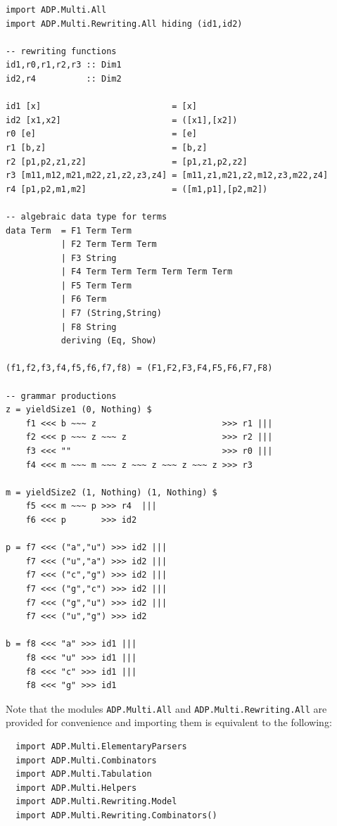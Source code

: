 \documentclass[
    a4paper,
    12pt,
    twoside,
    BCOR=12mm,
    parskip=half,
    chapterprefix,
    numbers=noenddot,
    bibliography=totoc
]{scrbook}
\begin{document}
\begin{lstlisting}[name=lst_yield,caption=Implementation of $\mathcal{G}_{C2u-T}$ as yield parser with adp-multi]
import ADP.Multi.All
import ADP.Multi.Rewriting.All hiding (id1,id2)

-- rewriting functions
id1,r0,r1,r2,r3 :: Dim1
id2,r4          :: Dim2

id1 [x]                          = [x]
id2 [x1,x2]                      = ([x1],[x2])
r0 [e]                           = [e]
r1 [b,z]                         = [b,z]
r2 [p1,p2,z1,z2]                 = [p1,z1,p2,z2]
r3 [m11,m12,m21,m22,z1,z2,z3,z4] = [m11,z1,m21,z2,m12,z3,m22,z4]
r4 [p1,p2,m1,m2]                 = ([m1,p1],[p2,m2])

-- algebraic data type for terms
data Term  = F1 Term Term
           | F2 Term Term Term
           | F3 String
           | F4 Term Term Term Term Term Term
           | F5 Term Term
           | F6 Term
           | F7 (String,String)
           | F8 String
           deriving (Eq, Show)

(f1,f2,f3,f4,f5,f6,f7,f8) = (F1,F2,F3,F4,F5,F6,F7,F8)

-- grammar productions
z = yieldSize1 (0, Nothing) $
    f1 <<< b ~~~ z                         >>> r1 |||
    f2 <<< p ~~~ z ~~~ z                   >>> r2 |||
    f3 <<< ""                              >>> r0 |||
    f4 <<< m ~~~ m ~~~ z ~~~ z ~~~ z ~~~ z >>> r3
		
m = yieldSize2 (1, Nothing) (1, Nothing) $
    f5 <<< m ~~~ p >>> r4  |||
    f6 <<< p       >>> id2

p = f7 <<< ("a","u") >>> id2 |||
    f7 <<< ("u","a") >>> id2 |||
    f7 <<< ("c","g") >>> id2 |||
    f7 <<< ("g","c") >>> id2 |||
    f7 <<< ("g","u") >>> id2 |||
    f7 <<< ("u","g") >>> id2
			
b = f8 <<< "a" >>> id1 |||
    f8 <<< "u" >>> id1 |||
    f8 <<< "c" >>> id1 |||
    f8 <<< "g" >>> id1
\end{lstlisting}

\begin{remark}
  Note that the modules \verb|ADP.Multi.All| and \verb|ADP.Multi.Rewriting.All| are provided for convenience and importing them is equivalent to the following:
  \begin{lstlisting}
  import ADP.Multi.ElementaryParsers
  import ADP.Multi.Combinators
  import ADP.Multi.Tabulation
  import ADP.Multi.Helpers
  import ADP.Multi.Rewriting.Model
  import ADP.Multi.Rewriting.Combinators()
  \end{lstlisting}
\end{remark}
\end{document}
